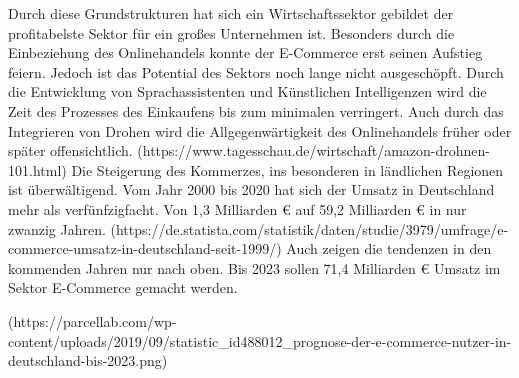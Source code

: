 



Durch diese Grundstrukturen hat sich ein Wirtschaftssektor gebildet der profitabelste Sektor für ein großes Unternehmen ist. Besonders durch die Einbeziehung des Onlinehandels konnte der E-Commerce erst seinen Aufstieg feiern. Jedoch ist das Potential des Sektors noch lange nicht ausgeschöpft. Durch die Entwicklung von Sprachassistenten und Künstlichen Intelligenzen wird die Zeit des Prozesses des Einkaufens bis zum minimalen verringert. Auch durch das Integrieren von Drohen wird die Allgegenwärtigkeit des Onlinehandels früher oder später offensichtlich. (https://www.tagesschau.de/wirtschaft/amazon-drohnen-101.html) 
Die Steigerung des Kommerzes, ins besonderen in ländlichen Regionen ist überwältigend. Vom Jahr 2000 bis 2020 hat sich der Umsatz in Deutschland mehr als verfünfzigfacht. Von 1,3 Milliarden € auf 59,2 Milliarden € in nur zwanzig Jahren. (https://de.statista.com/statistik/daten/studie/3979/umfrage/e-commerce-umsatz-in-deutschland-seit-1999/) Auch zeigen die tendenzen in den kommenden Jahren nur nach oben. Bis 2023 sollen 71,4 Milliarden € Umsatz im Sektor E-Commerce gemacht werden.       
 
(https://parcellab.com/wp-content/uploads/2019/09/statistic_id488012_prognose-der-e-commerce-nutzer-in-deutschland-bis-2023.png) 
